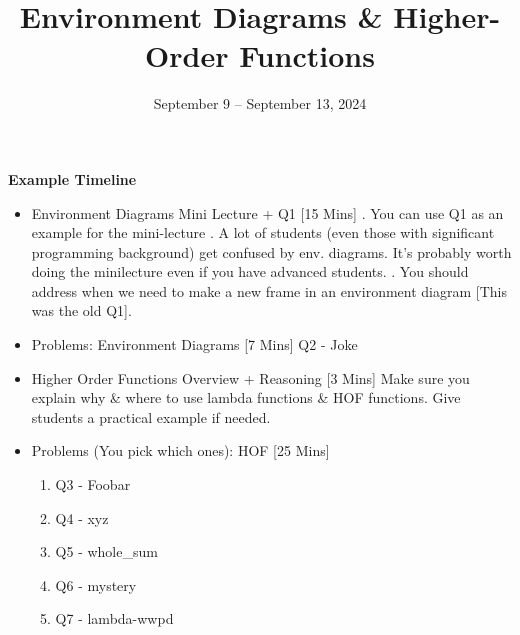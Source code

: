 \documentclass{exam}
\title{Environment Diagrams \& Higher-Order Functions}
\date{September 9 -- September 13, 2024}
\begin{document}
\maketitle

\begin{meta}
    \textbf{Example Timeline}
    \begin{itemize}
        \item Environment Diagrams Mini Lecture + Q1 [15 Mins]
            . You can use Q1 as an example for the mini-lecture
            . A lot of students (even those with significant programming background) get confused by env. diagrams. It's probably worth doing the minilecture even if you have advanced students.
            . You should address when we need to make a new frame in an environment diagram [This was the old Q1].
        \item Problems: Environment Diagrams [7 Mins]
            \subitem Q2 - Joke
        \item Higher Order Functions Overview + Reasoning [3 Mins]
            \subitem Make sure you explain why \& where to use lambda functions \& HOF functions. Give students a practical example if needed.
        \item Problems (You pick which ones): HOF [25 Mins]
        \begin{enumerate}
            \item Q3 - Foobar
            \item Q4 - xyz
            \item Q5 - whole\_sum
            \item Q6 - mystery
            \item Q7 - lambda-wwpd
        \end{enumerate}
        
    \end{itemize}
\end{meta}
\end{document}
